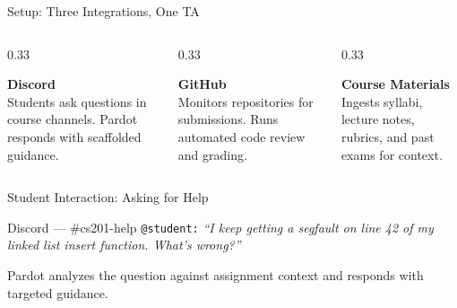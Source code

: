 \documentclass[aspectratio=169]{beamer}
\begin{document}
\begin{frame}{Setup: Three Integrations, One TA}
\begin{columns}[T]
\begin{column}{0.33\textwidth}
\begin{center}
\textbf{Discord}\\[0.5em]
\small
Students ask questions in course channels.
Pardot responds with scaffolded guidance.
\end{center}
\end{column}
\begin{column}{0.33\textwidth}
\begin{center}
\textbf{GitHub}\\[0.5em]
\small
Monitors repositories for submissions.
Runs automated code review and grading.
\end{center}
\end{column}
\begin{column}{0.33\textwidth}
\begin{center}
\textbf{Course Materials}\\[0.5em]
\small
Ingests syllabi, lecture notes, rubrics, and past exams for context.
\end{center}
\end{column}
\end{columns}
\vfill
\begin{center}
\end{center}
\end{frame}

\begin{frame}{Student Interaction: Asking for Help}
\begin{block}{Discord --- \#cs201-help}
\texttt{@student:} \textit{``I keep getting a segfault on line 42 of my linked list insert function. What's wrong?''}
\end{block}
\vspace{1em}
\begin{center}
\end{center}
\vspace{1em}
\small Pardot analyzes the question against assignment context and responds with targeted guidance.
\end{frame}
\end{document}
